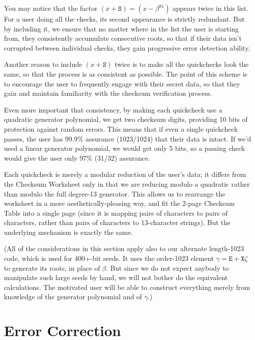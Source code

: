 \documentclass[letterpaper]{article}
\newcommand{\vc}[1]{\texttt{#1}} %
\begin{document}
You may notice that the factor $(x + \vc{S}) = (x - \beta^{81})$ appears twice in
this list. For a user doing all the checks, its second appearance is strictly
redundant. But by including it, we ensure that no matter where in the list the
user is starting from, they consistently accumulate consecutive roots, so that
if their data isn't corrupted between individual checks, they gain progressive
error detection ability.

Another reason to include $(x+\vc{S})$ twice is to make all the quickchecks look
the same, so that the process is as consistent as possible. The point of this
scheme is to encourage the user to frequently engage with their secret data, so
that they gain and maintain familiarity with the checksum verification process.

Even more important that consistency, by making each quickcheck use a quadratic
generator polynomial, we get two checksum digits, providing 10 bits of protection
against random errors. This means that if even a single quickcheck passes, the
user has 99.9\% assurance (1023/1024) that their data is intact. If we'd used a
linear generator polynomial, we would get only 5 bits, so a passing check would
give the user only 97\% (31/32) assurance.

Each quickcheck is merely a modular reduction of the user's data; it differs
from the Checksum Worksheet only in that we are reducing modulo a quadratic
rather than modulo the full degree-13 generator. This allows us to rearrange
the worksheet in a more aesthetically-pleasing way, and fit the 2-page Checksum
Table into a single page (since it is mapping pairs of characters to pairs of
characters, rather than pairs of characters to 13-character strings). But the
underlying mechanism is exactly the same.

(All of the considerations in this section apply also to our alternate length-1023
code, which is used for 400+-bit seeds. It uses the order-1023 element
$\gamma=\vc{E} + \vc{X}\zeta$ to generate its roots, in place of $\beta$. But since
we do not expect anybody to manipulate such large seeds by hand, we will not
bother do the equivalent calculations. The motivated user will be able to construct
everything merely from knowledge of the generator polynomial and of $\gamma$.)

\section{Error Correction}
\end{document}
